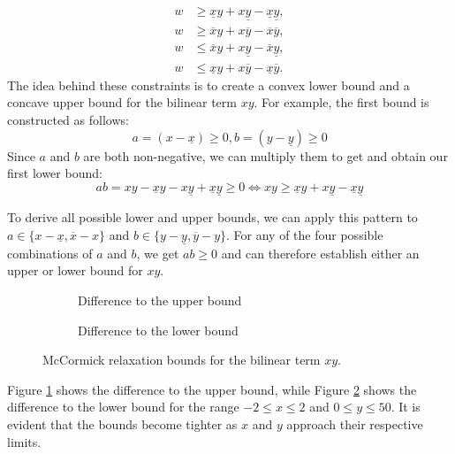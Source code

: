 \[
	\begin{aligned}
		w & \geq \underline{x} y + x \underline{y} - \underline{x} \underline{y}, \\
		w & \geq \overline{x} y + x \overline{y} - \overline{x} \overline{y},     \\
		w & \leq \overline{x} y + x \underline{y} - \overline{x} \underline{y},   \\
		w & \leq \underline{x} y + x \overline{y} - \underline{x} \overline{y}.
	\end{aligned}
\]
The idea behind these constraints is to create a convex lower bound and a concave upper bound for the bilinear term $xy$.
For example, the first bound is constructed as follows: \[ a = (x - \underline{x}) \geq 0, b = (y - \underline{y}) \geq 0 \] Since $a$ and $b$ are
both non-negative, we can multiply them to get and obtain our first lower bound: \[ ab = xy - \underline{x}y - x\underline{y} +
	\underline{x}\underline{y} \geq 0 \iff xy \geq \underline{x}y + x\underline{y} - \underline{x}\underline{y} \]

To derive all
possible lower and upper bounds, we can apply this pattern to $a \in \{x - \underline{x}, \overline{x} - x\}$ and $b \in \{y - \underline{y},
	\overline{y} - y\}$.
For any of the four possible combinations of $a$ and $b$, we get $ab \geq 0$ and can therefore establish either an upper or lower bound for $xy$.

\begin{figure}[h]
	\centering
	\begin{subfigure}[b]{0.45\textwidth}
		\centering
		\resizebox{\textwidth}{!}{}
		\caption{Difference to the upper bound}
		\label{fig:mccormick_0_upper}
	\end{subfigure}
	\hfill
	\begin{subfigure}[b]{0.45\textwidth}
		\centering
		\resizebox{\textwidth}{!}{}
		\caption{Difference to the lower bound}
		\label{fig:mccormick_0_lower}
	\end{subfigure}
	\caption{McCormick relaxation bounds for the bilinear term $ xy $.}
	\label{fig:mccormick_bounds_0}
\end{figure}

Figure \ref{fig:mccormick_0_upper} shows the difference to the upper bound, while Figure \ref{fig:mccormick_0_lower} shows the difference to the
lower bound for the range $ -2 \leq x \leq 2 $ and $ 0 \leq y \leq 50 $.
It is evident that the bounds become tighter as $ x $ and $ y $ approach their respective limits.

